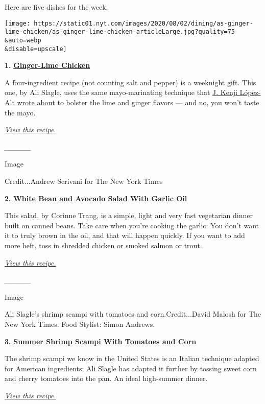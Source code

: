 Here are five dishes for the week:

\texttt{[image: https://static01.nyt.com/images/2020/08/02/dining/as-ginger-lime-chicken/as-ginger-lime-chicken-articleLarge.jpg?quality=75\\\&auto=webp\\\&disable=upscale]}

\textbf{1.}
\href{https://cooking.nytimes.com/recipes/1021294-ginger-lime-chicken}{\textbf{Ginger-Lime
Chicken}}

A four-ingredient recipe (not counting salt and pepper) is a weeknight
gift. This one, by Ali Slagle, uses the same mayo-marinating technique
that
\href{https://www.nytimes.com/2019/10/28/dining/mayo-meat-marinade.html}{J.
Kenji López-Alt wrote about} to bolster the lime and ginger flavors ---
and no, you won't taste the mayo.

\href{https://cooking.nytimes.com/recipes/1021294-ginger-lime-chicken}{\emph{View
this recipe.}}

\emph{\_\_\_\_\_}

Image

Credit...Andrew Scrivani for The New York Times

\textbf{2.}
\href{https://cooking.nytimes.com/recipes/1020146-white-bean-and-avocado-salad-with-garlic-oil}{\textbf{White
Bean and Avocado Salad With Garlic Oil}}

This salad, by Corinne Trang, is a simple, light and very fast
vegetarian dinner built on canned beans. Take care when you're cooking
the garlic: You don't want it to truly brown in the oil, and that will
happen quickly. If you want to add more heft, toss in shredded chicken
or smoked salmon or trout.

\href{https://cooking.nytimes.com/recipes/1020146-white-bean-and-avocado-salad-with-garlic-oil}{\emph{View
this recipe.}}

\emph{\_\_\_\_\_}

Image

Ali Slagle's shrimp scampi with tomatoes and corn.Credit...David Malosh
for The New York Times. Food Stylist: Simon Andrews.

\textbf{3.}
\href{https://cooking.nytimes.com/recipes/1021184-summer-shrimp-scampi-with-tomatoes-and-corn}{\textbf{Summer
Shrimp Scampi With Tomatoes and Corn}}

The shrimp scampi we know in the United States is an Italian technique
adapted for American ingredients; Ali Slagle has adapted it further by
tossing sweet corn and cherry tomatoes into the pan. An ideal
high-summer dinner.

\href{https://cooking.nytimes.com/recipes/1021184-summer-shrimp-scampi-with-tomatoes-and-corn}{\emph{View
this recipe.}}

